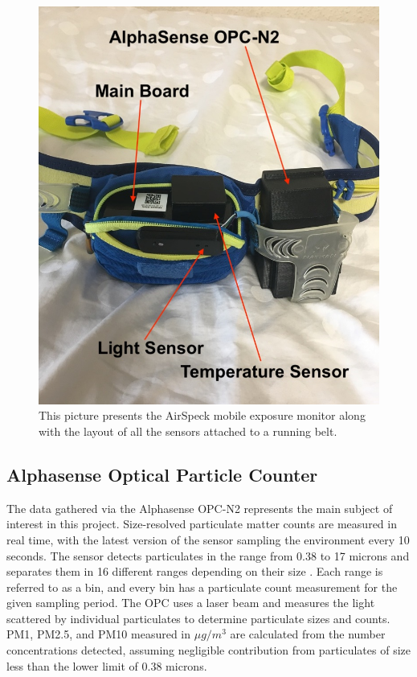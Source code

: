 \documentclass[bsc,frontabs,twoside,singlespacing, parskip,deptreport]{infthesis}     %
\begin{document}
\begin{figure}[h!]
  \center
  \includegraphics[width=\columnwidth]{airspeck.jpeg} 
  \caption{This picture presents the AirSpeck mobile exposure monitor along with the layout of all the sensors attached to a running belt.}
  \label{fig:airspeck}
\end{figure}


\subsection*{Alphasense Optical Particle Counter}

The data gathered via the Alphasense OPC-N2 \cite{opc} represents the main subject of interest in this project. Size-resolved particulate matter counts are measured in real time, with the latest version of the sensor sampling the environment every 10 seconds. The sensor detects particulates in the range from 0.38 to 17 microns and separates them in 16 different ranges depending on their size \cite{airspeck}. Each range is referred to as a bin, and every bin has a particulate count measurement for the given sampling period. The OPC uses a laser beam and measures the light scattered by individual particulates to determine particulate sizes and counts. PM1, PM2.5, and PM10 measured in $ \mu g /m^3 $ are calculated from the number concentrations detected, assuming negligible contribution from particulates of size less than the lower limit of 0.38 microns.
\end{document}
